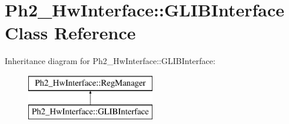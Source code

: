 \hypertarget{class_ph2___hw_interface_1_1_g_l_i_b_interface}{\section{Ph2\-\_\-\-Hw\-Interface\-:\-:G\-L\-I\-B\-Interface Class Reference}
\label{class_ph2___hw_interface_1_1_g_l_i_b_interface}
}
Inheritance diagram for Ph2\-\_\-\-Hw\-Interface\-:\-:G\-L\-I\-B\-Interface\-:\begin{figure}[H]
\begin{center}
\leavevmode
\includegraphics[height=2.000000cm]{class_ph2___hw_interface_1_1_g_l_i_b_interface}
\end{center}
\end{figure}
